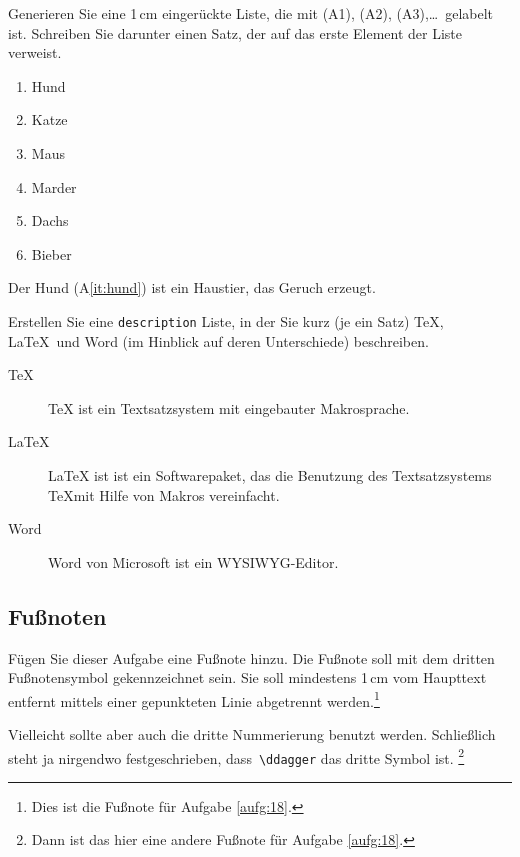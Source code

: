 \begin{aufgabe}
Generieren Sie eine 1\,cm einger\"uckte Liste, die mit (A1), (A2), (A3),\dots\ gelabelt ist. Schreiben Sie darunter einen Satz, der auf das erste Element der Liste verweist.
\end{aufgabe}

\begin{enumerate}[\hspace{1cm} ({A}1)]
 \item Hund \label{it:hund}
 \item Katze \label{it:katze}
 \item Maus
 \item Marder
 \item Dachs
 \item Bieber
\end{enumerate}

\noindent Der Hund (A\ref{it:hund}) ist ein Haustier, das Geruch erzeugt.

\pagebreak
\begin{aufgabe}\label{aufg:desc}
Erstellen Sie eine \textnormal{\texttt{description}} Liste, in der Sie kurz
(je ein Satz) \TeX, \LaTeX\ und Word (im Hinblick auf deren Unterschiede)
beschreiben.
\end{aufgabe}

\begin{description}
 \item[\TeX] TeX ist ein Textsatzsystem mit eingebauter Makrosprache.
 \item[\LaTeX] LaTeX ist ist ein Softwarepaket, das die Benutzung des Textsatzsystems \TeX mit Hilfe von Makros vereinfacht.
 \item[Word] Word von Microsoft ist ein WYSIWYG-Editor.
\end{description}

\subsection{Fußnoten}
\begin{aufgabe}
\label{aufg:18}
\setcounter{footnote}{2}
\renewcommand{\thefootnote}{\fnsymbol{footnote}}
F\"ugen Sie dieser Aufgabe eine Fu\ss note hinzu. Die Fu\ss{}note soll mit dem dritten Fu\ss{}notensymbol
gekennzeichnet sein. Sie soll mindestens 1\,cm  vom Haupttext entfernt mittels einer gepunkteten Linie 
abgetrennt werden.\footnote{Dies ist die Fußnote für Aufgabe \ref{aufg:18}.}
\end{aufgabe}

Vielleicht sollte aber auch die dritte Nummerierung benutzt werden. 
Schließlich steht ja nirgendwo festgeschrieben, 
dass~\verb*|\ddagger| das dritte Symbol ist. 
\hspace{-0.1cm}\footnote[3]{Dann ist das hier eine andere Fußnote für Aufgabe \ref{aufg:18}.}

